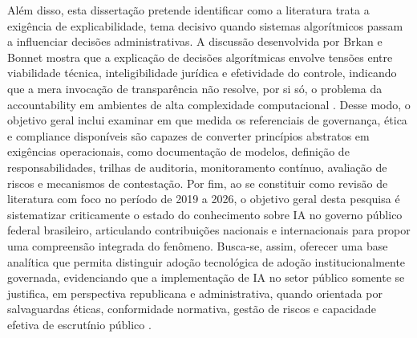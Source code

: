 \documentclass[12pt,a4paper]{article}
\begin{document}
Além disso, esta dissertação pretende identificar como a literatura trata a exigência de explicabilidade, tema decisivo quando sistemas algorítmicos passam a influenciar decisões administrativas. A discussão desenvolvida por Brkan e Bonnet mostra que a explicação de decisões algorítmicas envolve tensões entre viabilidade técnica, inteligibilidade jurídica e efetividade do controle, indicando que a mera invocação de transparência não resolve, por si só, o problema da accountability em ambientes de alta complexidade computacional \autocite{brkan2020legal}. Desse modo, o objetivo geral inclui examinar em que medida os referenciais de governança, ética e compliance disponíveis são capazes de converter princípios abstratos em exigências operacionais, como documentação de modelos, definição de responsabilidades, trilhas de auditoria, monitoramento contínuo, avaliação de riscos e mecanismos de contestação.
Por fim, ao se constituir como revisão de literatura com foco no período de 2019 a 2026, o objetivo geral desta pesquisa é sistematizar criticamente o estado do conhecimento sobre IA no governo público federal brasileiro, articulando contribuições nacionais e internacionais para propor uma compreensão integrada do fenômeno. Busca-se, assim, oferecer uma base analítica que permita distinguir adoção tecnológica de adoção institucionalmente governada, evidenciando que a implementação de IA no setor público somente se justifica, em perspectiva republicana e administrativa, quando orientada por salvaguardas éticas, conformidade normativa, gestão de riscos e capacidade efetiva de escrutínio público \autocite{sigfrids2022how} \autocite{batool2025ai} \autocite{goulart2025processos}.
\end{document}
